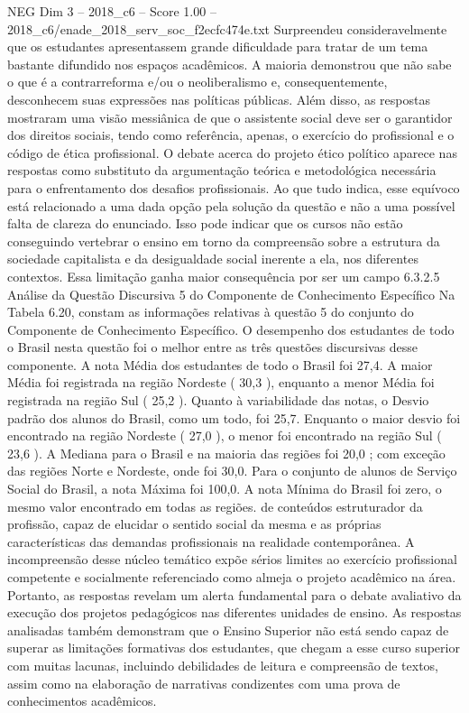 \begin{textsample}{NEG Dim 3 – 2018\_c6 – Score 1.00 – 2018\_c6/enade\_2018\_serv\_soc\_f2ecfc474e.txt}
Surpreendeu consideravelmente que os estudantes apresentassem grande dificuldade para tratar de um tema bastante difundido nos espaços acadêmicos.
A maioria demonstrou que não sabe o que é a contrarreforma e/ou o neoliberalismo e, consequentemente, desconhecem suas expressões nas políticas públicas.
Além disso, as respostas mostraram uma visão messiânica de que o assistente social deve ser o garantidor dos direitos sociais, tendo como referência, apenas, o exercício do profissional e o código de ética profissional.
O debate acerca do projeto ético político aparece nas respostas como substituto da argumentação teórica e metodológica necessária para o enfrentamento dos desafios profissionais.
Ao que tudo indica, esse equívoco está relacionado a uma dada opção pela solução da questão e não a uma possível falta de clareza do enunciado.
Isso pode indicar que os cursos não estão conseguindo vertebrar o ensino em torno da compreensão sobre a estrutura da sociedade capitalista e da desigualdade social inerente a ela, nos diferentes contextos.
Essa limitação ganha maior consequência por ser um campo 6.3.2.5 Análise da Questão Discursiva 5 do Componente de Conhecimento Específico Na Tabela 6.20, constam as informações relativas à questão 5 do conjunto do Componente de Conhecimento Específico.
O desempenho dos estudantes de todo o Brasil nesta questão foi o melhor entre as três questões discursivas desse componente.
A nota Média dos estudantes de todo o Brasil foi 27,4.
A maior Média foi registrada na região Nordeste ( 30,3 ), enquanto a menor Média foi registrada na região Sul ( 25,2 ).
Quanto à variabilidade das notas, o Desvio padrão dos alunos do Brasil, como um todo, foi 25,7.
Enquanto o maior desvio foi encontrado na região Nordeste ( 27,0 ), o menor foi encontrado na região Sul ( 23,6 ).
A Mediana para o Brasil e na maioria das regiões foi 20,0 ; com exceção das regiões Norte e Nordeste, onde foi 30,0.
Para o conjunto de alunos de Serviço Social do Brasil, a nota Máxima foi 100,0.
A nota Mínima do Brasil foi zero, o mesmo valor encontrado em todas as regiões. de conteúdos estruturador da profissão, capaz de elucidar o sentido social da mesma e as próprias características das demandas profissionais na realidade contemporânea.
A incompreensão desse núcleo temático expõe sérios limites ao exercício profissional competente e socialmente referenciado como almeja o projeto acadêmico na área.
Portanto, as respostas revelam um alerta fundamental para o debate avaliativo da execução dos projetos pedagógicos nas diferentes unidades de ensino.
As respostas analisadas também demonstram que o Ensino Superior não está sendo capaz de superar as limitações formativas dos estudantes, que chegam a esse curso superior com muitas lacunas, incluindo debilidades de leitura e compreensão de textos, assim como na elaboração de narrativas condizentes com uma prova de conhecimentos acadêmicos.

\end{textsample}
